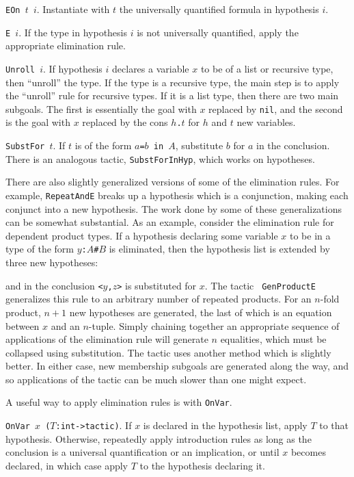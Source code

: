 {\tt EOn $t$ $i$}.  Instantiate with $t$ the universally quantified formula
in hypothesis $i$.

{\tt E $i$}.  If the type in hypothesis $i$ is not universally quantified,
apply the appropriate elimination rule.

{\tt Unroll $i$}.  If hypothesis $i$ declares a variable $x$ to be of a list or
recursive type, then ``unroll'' the type.  If the type is a recursive type, the
main step is to apply the ``unroll'' rule for recursive types.  If it is a list
type, then there are two main subgoals.  The first is essentially the goal with
$x$ replaced by {\tt nil}, and the second is the goal with $x$ replaced by the
cons {\tt $h$.$t$} for $h$ and $t$ new variables.

{\tt SubstFor $t$}.  If $t$ is of the form {\tt $a$=$b$~in~$A$}, substitute $b$
for $a$ in the conclusion.  There is an analogous tactic, {\tt SubstForInHyp},
which works on hypotheses.

There are also slightly generalized versions of some of the elimination rules.
For example, {\tt RepeatAndE} breaks up a hypothesis which is a conjunction,
making each conjunct into a new hypothesis.  The work done by some of these
generalizations can be somewhat substantial.  As an example, consider
the elimination rule for dependent product types.  If a hypothesis declaring
some variable $x$ to be in a type of the form {\tt $y$:$A$\#$B$}
is eliminated, then the hypothesis list is extended by three new hypotheses: 
\begin{Numath}
\end{Numath}%
and in the conclusion {\tt <$y$,$z$>} is substituted for $x$.  The tactic {\tt
GenProductE} generalizes this rule to an arbitrary number of repeated
products.
For an $n$-fold product, $n+1$ new
hypotheses are generated, the last of which is an equation between $x$ and an
$n$-tuple.  Simply chaining together an appropriate sequence of applications of
the elimination rule will generate $n$ equalities, which must be collapsed using
substitution.  The tactic uses another method which is slightly better.  In
either case, new membership subgoals are generated along the way, and so
applications of the tactic can be much slower than one might expect.  

A useful way to apply elimination rules is with {\tt OnVar}.

{\tt OnVar $x$ ($T$:int->tactic)}.  If $x$ is declared in
the hypothesis list, apply $T$ to that hypothesis.  Otherwise, repeatedly
apply introduction rules as long as the conclusion is a universal quantification
or an implication, or until $x$ becomes declared, in which case apply
$T$ to the hypothesis declaring it.

